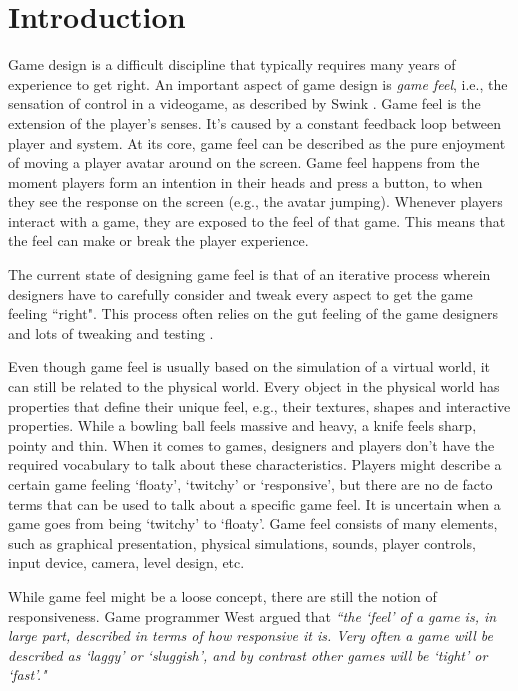 \section{Introduction}
Game design is a difficult discipline that typically requires many years of experience to get right. An important aspect of game design is \textit{game feel}, i.e., the sensation of control in a videogame, as described by Swink \cite{swink}. Game feel is the extension of the player's senses. It's caused by a constant feedback loop between player and system. At its core, game feel can be described as the pure enjoyment of moving a player avatar around on the screen. Game feel happens from the moment players form an intention in their heads and press a button, to when they see the response on the screen (e.g., the avatar jumping). Whenever players interact with a game, they are exposed to the feel of that game. This means that the feel can make or break the player experience.

The current state of designing game feel is that of an iterative process wherein designers have to carefully consider and tweak every aspect to get the game feeling ``right". This process often relies on the gut feeling of the game designers and lots of tweaking and testing \cite{meatboy1, meatboy2, juicyBeast, platformer_controls}.

Even though game feel is usually based on the simulation of a virtual world, it can still be related to the physical world. Every object in the physical world has properties that define their unique feel, e.g., their textures, shapes and interactive properties. While a bowling ball feels massive and heavy, a knife feels sharp, pointy and thin. When it comes to games, designers and players don't have the required vocabulary to talk about these characteristics. Players might describe a certain game feeling `floaty', `twitchy' or `responsive', but there are no de facto terms that can be used to talk about a specific game feel. It is uncertain when a game goes from being `twitchy' to `floaty'. Game feel consists of many elements, such as graphical presentation, physical simulations, sounds, player controls, input device, camera, level design, etc. 

While game feel might be a loose concept, there are still the notion of responsiveness. Game programmer West argued that \textit{``the `feel' of a game is, in large part, described in terms of how responsive it is. Very often a game will be described as `laggy' or `sluggish', and by contrast other games will be `tight' or `fast'."} \cite{measure_lag} 

